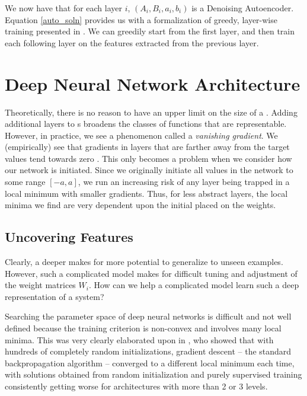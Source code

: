 We now have that for each layer $i$, $(A_i,B_i,a_i,b_i)$ is a Denoising Autoencoder. Equation \eqref{auto_soln} provides us with a formalization of greedy, layer-wise training presented in \citep{Vincent:2010fk}. We can greedily start from the first layer, and then train each following layer on the features extracted from the previous layer.




\section{Deep Neural Network Architecture}

Theoretically, there is no reason to have an upper limit on the size of a \nn{}. Adding additional layers to \nn{}s broadens the classes of functions that are representable. However, in practice, we see a phenomenon called a \emph{vanishing gradient}. We (empirically) see that gradients in layers that are farther away from the target values tend towards zero \citep{trainingdifficulty}. This only becomes a problem when we consider how our network is initiated. Since we originally initiate all values in the network to some range $[-a,a]$, we run an increasing risk of any layer being trapped in a local minimum with smaller gradients. Thus, for less abstract layers, the local minima we find are very dependent upon the initial placed on the weights. 

\subsection{Uncovering Features}

Clearly, a deeper \nn{} makes for more potential to generalize to unseen examples. However, such a complicated model makes for difficult tuning and adjustment of the weight matrices $W_i$. How can we help a complicated model learn such a deep representation of a system?

Searching the parameter space of deep neural networks is difficult and not well defined because the training criterion is non-convex and involves many local minima. This was very clearly elaborated upon in   \citep{Erhan:2009}, who showed that with hundreds of completely random initializations, gradient descent -- the standard backpropagation algorithm -- converged to a different local minimum each time, with solutions obtained from random initialization and purely supervised training consistently getting worse for architectures with more than 2 or 3 levels.

